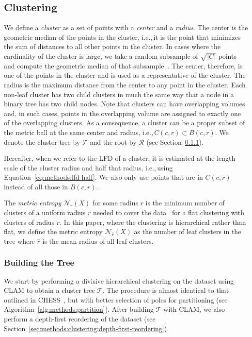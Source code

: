 \subsection{Clustering}
\label{sec:methods:clustering}

We define a \textit{cluster} as a set of points with a \textit{center} and a \textit{radius}.
The center is the geometric median of the points in the cluster, i.e.,\,it is the point that minimizes the sum of distances to all other points in the cluster.
In cases where the cardinality of the cluster is large, we take a random subsample of $\sqrt{|C|}$ points and compute the geometric median of that subsample~\cite{ishaq2019clustered}.
The center, therefore, is one of the points in the cluster and is used as a representative of the cluster.
The radius is the maximum distance from the center to any point in the cluster.
Each non-leaf cluster has two child clusters in much the same way that a node in a binary tree has two child nodes.
Note that clusters can have overlapping volumes and, in such cases, points in the overlapping volume are assigned to exactly one of the overlapping clusters.
As a consequence, a cluster can be a proper subset of the metric ball at the same center and radius, i.e.,\,$C(c, r) \subset B(c, r)$. We denote the cluster tree by $\mathcal{T}$ and the root by $\mathcal{R}$ (see Section~\ref{sec:methods:clustering:building-the-tree}). 

Hereafter, when we refer to the LFD of a cluster, it is estimated at the length scale of the cluster radius and half that radius, i.e.,\,using Equation~\ref{eq:methods:lfd-half}.
We also only use points that are in $C(c, r)$ instead of all those in $B(c, r)$.

The \textit{metric entropy} $\mathcal{N}_{r}(X)$ for some radius $r$ is the minimum number of clusters of a uniform radius $r$ needed to cover the data~\cite{yu2015entropy} for a flat clustering with clusters of radius $r$.
In this paper, where the clustering is hierarchical rather than flat, we define the metric entropy $\mathcal{N}_{\hat{r}}(X)$ as the number of leaf clusters in the tree where $\hat{r}$ is the mean radius of all leaf clusters.


\subsubsection{Building the Tree}
\label{sec:methods:clustering:building-the-tree}

We start by performing a divisive hierarchical clustering on the dataset using CLAM to obtain a cluster tree $\mathcal{T}$.
The procedure is almost identical to that outlined in CHESS~\cite{ishaq2019clustered}, but with better selection of poles for partitioning (see Algorithm~\ref{alg:methods:partition}).
After building $\mathcal{T}$ with CLAM, we also perform a depth-first reordering of the dataset (see Section~\ref{sec:methods:clustering:depth-first-reordering}).

